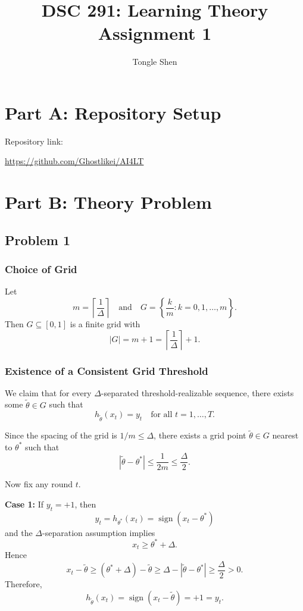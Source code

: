 \documentclass{article}
\title{DSC 291: Learning Theory Assignment 1}
\author{Tongle Shen}
\begin{document}
\maketitle

\section{Part A: Repository Setup}

Repository link:

\url{https://github.com/Ghostlikei/AI4LT}

\newpage
\section{Part B: Theory Problem}

\subsection{Problem 1}

\subsubsection{Choice of Grid}

Let
$$
m = \left\lceil \frac{1}{\Delta} \right\rceil
\quad \text{and} \quad
G = \left\{ \frac{k}{m} : k = 0,1,\dots,m \right\}.
$$
Then $G \subseteq [0,1]$ is a finite grid with
$$
|G| = m+1 = \left\lceil \frac{1}{\Delta} \right\rceil + 1.
$$

\subsubsection{Existence of a Consistent Grid Threshold}

We claim that for every $\Delta$-separated threshold-realizable sequence, there exists some
$\widetilde{\theta} \in G$ such that
$$
h_{\widetilde{\theta}}(x_t) = y_t
\quad \text{for all } t = 1,\dots,T.
$$

Since the spacing of the grid is $1/m \leq \Delta$, there exists a grid point
$\widetilde{\theta} \in G$ nearest to $\theta^*$ such that
$$
|\widetilde{\theta} - \theta^*| \leq \frac{1}{2m} \leq \frac{\Delta}{2}.
$$

Now fix any round $t$.

\textbf{Case 1: } If $y_t = +1$, then
$$
y_t = h_{\theta^*}(x_t) = \operatorname{sign}(x_t - \theta^*)
$$
and the $\Delta$-separation assumption implies
$$
x_t \geq \theta^* + \Delta.
$$
Hence
$$
x_t - \widetilde{\theta}
\geq (\theta^* + \Delta) - \widetilde{\theta}
\geq \Delta - |\widetilde{\theta} - \theta^*|
\geq \frac{\Delta}{2}
> 0.
$$
Therefore,
$$
h_{\widetilde{\theta}}(x_t) = \operatorname{sign}(x_t - \widetilde{\theta}) = +1 = y_t.
$$
\end{document}
